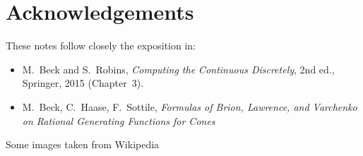 \documentclass[11pt]{article}
\theoremstyle{plain}
\theoremstyle{definition}
\begin{document}
\section*{Acknowledgements}

These notes follow closely the exposition in:
\begin{itemize}
  \item M.\ Beck and S.\ Robins, \textit{Computing the Continuous Discretely},
        2nd ed., Springer, 2015 (Chapter~3).
  \item M.\ Beck, C.\ Haase,  F.\ Sottile, \textit{Formulas of Brion, Lawrence, and Varchenko on Rational Generating Functions for Cones}
\end{itemize}
Some images taken from Wikipedia
\end{document}
